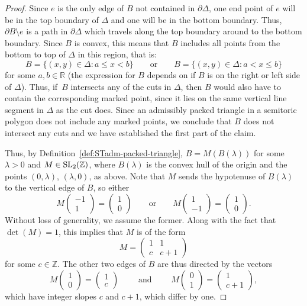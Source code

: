 \documentclass[10pt,a4paper]{amsart}
\numberwithin{equation}{section}
\def\R{{\mathbb R}}
\def\Z{{\mathbb Z}}
\newcommand{\De}{\Delta}
\newcommand{\SL}{{\rm SL}_2(\Z)}
\newcommand{\vectbig}[2]{\begin{pmatrix} #1 \\ #2 \end{pmatrix}}
\theoremstyle{definition}
\theoremstyle{plain}
\theoremstyle{plain}
\begin{document}
\begin{proof}
Since $e$ is the only edge of $B$ not contained in $\partial \De$, one end point of $e$ will be in the top boundary of $\De$ and one will be in the bottom boundary. Thus, $\partial B \setminus e$ is a path in $\partial \De$ which travels along the top boundary around to the bottom boundary. Since $B$ is convex, this means that $B$ includes all points from the bottom to top of $\De$ in this region, that is:
\[B = \{(x,y)\in\De\colon a \leq x < b\} \qquad \text{or} \qquad B = \{(x,y)\in\De\colon a < x \leq b\}\]
for some $a,b\in\R$ (the expression for $B$ depends on if $B$ is on the right or left side of $\De$).
Thus, if~$B$ intersects any of the cuts in $\De$, then $B$ would also have to contain the corresponding marked point, since it lies on the same vertical line segment in $\De$ as the cut does. Since an admissibly packed triangle in a semitoric polygon does not include any marked points, we conclude that $B$ does not intersect any cuts and we have established the first part of the claim.

Thus, by Definition~\ref{def:STadm-packed-triangle},
$B = M(B(\lambda))$ for some $\lambda>0$ and $M\in\SL$, where $B(\lambda)$ is the convex hull of the origin and the points $(0,\lambda)$, $(\lambda, 0)$, as above.
Note that $M$ sends the hypotenuse of $B(\lambda)$ to the vertical edge of $B$, so either
\[
 M \vectbig{-1}{1} = \vectbig{1}{0} \qquad \text{or}\qquad M \vectbig{1}{-1} = \vectbig{1}{0}.
\]
Without loss of generality, we assume the former.
Along with the fact that $\det(M) = 1$, this implies that $M$ is of the form
\[
M = \begin{pmatrix} 1 & 1\\ c & c+1\end{pmatrix}
\]
for some $c\in \Z$.
The other two edges of $B$ are thus directed by the vectors
\[
M \vectbig{1}{0} = \vectbig{1}{c} \qquad\text{ and }\qquad M \vectbig{0}{1} = \vectbig{1}{c+1},
\]
which have integer slopes $c$ and $c+1$, which differ by one.
\end{proof}
\end{document}
